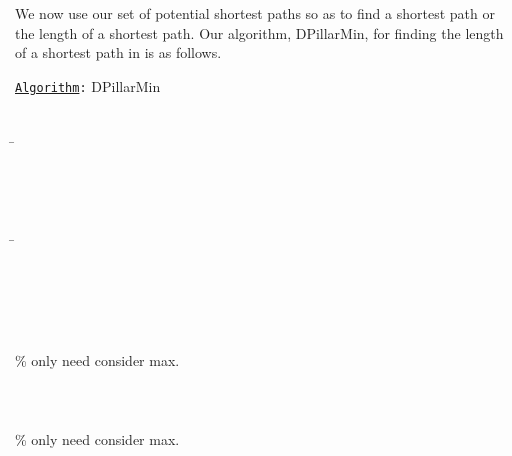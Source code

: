 \documentclass{article}
\begin{document}
We now use our set  of potential shortest paths so as to find a shortest path or the length of a shortest path. Our algorithm, DPillarMin, for finding the length of a shortest path in  is as follows. 
\begin{tabbing}
\hspace{0.2in}\={\tt \underline{Algorithm}:} DPillarMin\\
\\
\\
\>\hspace{0.2in}\={\tt }\\
\>\\
\>\\
\>\\
\>\\
\>\>\hspace{0.2in}\={\tt }\\
\>\>\>\hspace{1.7in}{\tt }\\
\>\\
\>\>\>{\tt }\\
\>\>\>\hspace{1.7in}{\tt }\\
\>\\
\>\>\hspace{0.1in}\% only need consider max. \\
\>\>\>{\tt }\\
\>\>\>\hspace{0.65in}{\tt }\\
\>\\
\>\>\hspace{0.15in}\% only need consider max. \\
\>\>\>{\tt }\\
\>\>\>\hspace{1.8in}{\tt }\\
\\
\>\\
\>\\
\>\\
\>\>\\
\>\>\\
\>\>\\
\>\>\>\hspace{0.2in} \\
\>\\
\>\>\>{\tt }\\
\end{tabbing}
\end{document}
